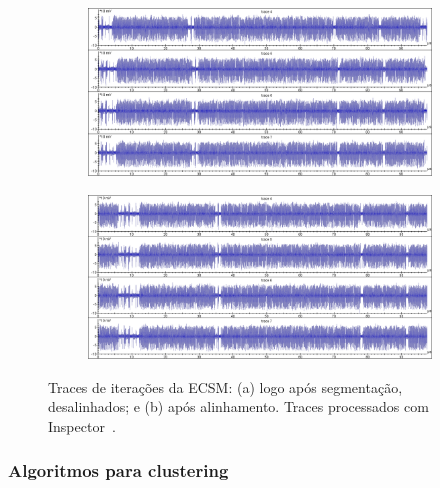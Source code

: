 \begin{figure}
	\label{fig:traceAlignment}
	\centering
	\begin{subfigure}[b]{0.8\textwidth}
		\includegraphics[width=1\linewidth]{figures/Traces_EM___MontLadder___CPU_168MHz___SR_1GHz___28MS___Misaligned.png}
		\caption{}
		\label{fig:misaligned} 
	\end{subfigure}
	
	\begin{subfigure}[b]{0.8\textwidth}
		\includegraphics[width=1\linewidth]{figures/Traces_EM___MontLadder___CPU_168MHz___SR_1GHz___28MS___Aligned.png}
		\caption{}
		\label{fig:aligned}
	\end{subfigure}	
	
	\caption{Traces de iterações da ECSM: (a) logo após segmentação, desalinhados; e (b) após alinhamento. Traces processados com Inspector~\cite{RiscureInspector}.}
\end{figure}

\subsubsection{Algoritmos para clustering}


